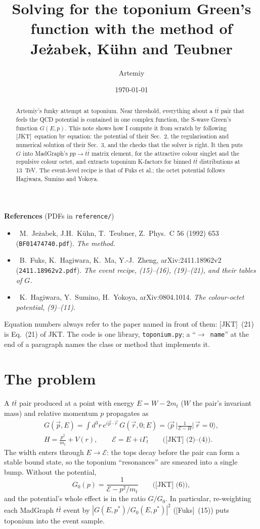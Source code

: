 \documentclass[11pt]{article}
\title{Solving for the toponium Green's function with the method of Je\.zabek, K\"uhn and Teubner}
\author{Artemiy}
\date{\today}
\newcommand{\code}[1]{\texttt{#1}}
\newcommand{\Gt}{\Gamma_t}
\newcommand{\cE}{\mathcal{E}}
\newcommand{\JKT}{[JKT]}
\newcommand{\Fuks}{[Fuks]}
\newcommand{\HSY}{[HSY]}
\begin{document}
\maketitle

\begin{abstract}
\noindent Artemiy's funky attempt at toponium. Near threshold, everything about a $t\bar t$ pair that feels the QCD
potential is contained in one complex function, the S-wave Green's function $G(E,p)$. This note shows how I compute it
from scratch by following \JKT\ equation by equation: the potential of their Sec.~2, the regularisation and numerical
solution of their Sec.~3, and the checks that the solver is right. It then puts $G$ into MadGraph's $pp\to t\bar t$ matrix element,
for the attractive colour singlet and the repulsive colour octet, and extracts toponium K-factors for binned $t\bar t$
distributions at 13~TeV. The event-level recipe is that of Fuks et al.; the octet potential follows Hagiwara, Sumino and Yokoya.
\end{abstract}

\noindent\textbf{References} (PDFs in \code{reference/})
\begin{itemize}
  \item \JKT\ M.~Je\.zabek, J.H.~K\"uhn, T.~Teubner, Z.~Phys.~C 56 (1992) 653 (\code{BF01474740.pdf}). \emph{The method.}
  \item \Fuks\ B.~Fuks, K.~Hagiwara, K.~Ma, Y.-J.~Zheng, arXiv:2411.18962v2 (\code{2411.18962v2.pdf}). \emph{The event recipe, (15)--(16), (19)--(21), and their tables of $G$.}
  \item \HSY\ K.~Hagiwara, Y.~Sumino, H.~Yokoya, arXiv:0804.1014. \emph{The colour-octet potential, (9)--(11).}
\end{itemize}
Equation numbers always refer to the paper named in front of them: \JKT\ (21) is Eq.~(21) of JKT.
The code is one library, \code{toponium.py}; a ``$\to$~\code{name}'' at the end of a paragraph names the class or method
that implements it.

\section{The problem}

A $t\bar t$ pair produced at a point with energy $E=W-2m_t$ ($W$ the pair's invariant mass) and relative momentum $p$
propagates as
\begin{gather*}
G(\vec p,E)=\int d^3r\,e^{i\vec p\cdot\vec r}\,G(\vec r,0;E)
=\Big\langle\vec p\,\Big|\frac{1}{\cE-H}\Big|\,\vec r=0\Big\rangle,\\
H=\frac{p^2}{m_t}+V(r),\qquad \cE=E+i\Gt
\qquad\text{(\JKT\ (2)--(4))}.
\end{gather*}
The width enters through $E\to\cE$: the tops decay before the pair can form a stable bound state, so the toponium
``resonances'' are smeared into a single bump. Without the potential,
$$
G_0(p)=\frac{1}{\cE-p^2/m_t}\qquad\text{(\JKT\ (6))},
$$
and the potential's whole effect is in the ratio $G/G_0$. In particular, re-weighting each MadGraph $t\bar t$ event by
$|G(E,p^*)/G_0(E,p^*)|^2$ (\Fuks\ (15)) puts toponium into the event sample.
\end{document}
